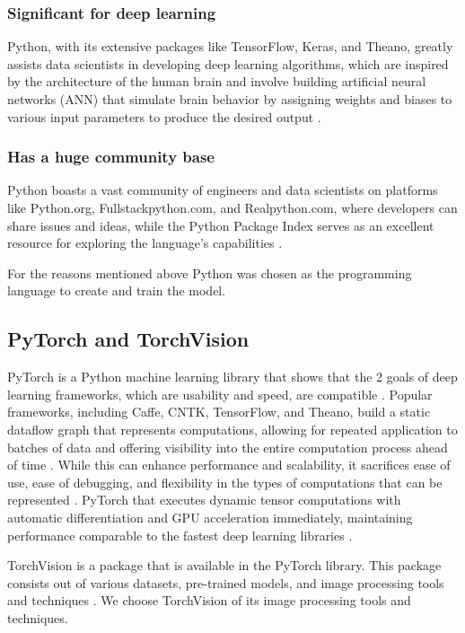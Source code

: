 \documentclass[conference]{IEEEtran}
\begin{document}
\subsubsection{Significant for deep learning}

Python, with its extensive packages like TensorFlow, Keras, and Theano, greatly assists data scientists in developing deep learning algorithms, which are inspired by the architecture of the human brain and involve building artificial neural networks (ANN) that simulate brain behavior by assigning weights and biases to various input parameters to produce the desired output \cite{b8}.

\subsubsection{Has a huge community base}

Python boasts a vast community of engineers and data scientists on platforms like Python.org, Fullstackpython.com, and Realpython.com, where developers can share issues and ideas, while the Python Package Index serves as an excellent resource for exploring the language's capabilities \cite{b8}.

For the reasons mentioned above Python was chosen as the programming language to create and train the model.

\subsection{PyTorch and TorchVision}

PyTorch is a Python machine learning library that shows that the 2 goals of deep learning frameworks, which are usability and speed, are compatible \cite{b9}. Popular frameworks, including Caffe, CNTK, TensorFlow, and Theano, build a static dataflow graph that represents computations, allowing for repeated application to batches of data and offering visibility into the entire computation process ahead of time \cite{b9}. While this can enhance performance and scalability, it sacrifices ease of use, ease of debugging, and flexibility in the types of computations that can be represented \cite{b9}. PyTorch that executes dynamic tensor computations with automatic differentiation and GPU acceleration immediately, maintaining performance comparable to the fastest deep learning libraries \cite{b9}.

TorchVision is a package that is available in the PyTorch library. This package consists out of various datasets, pre-trained models, and image processing tools and techniques \cite{b10}. We choose TorchVision of its image processing tools and techniques.
\end{document}
